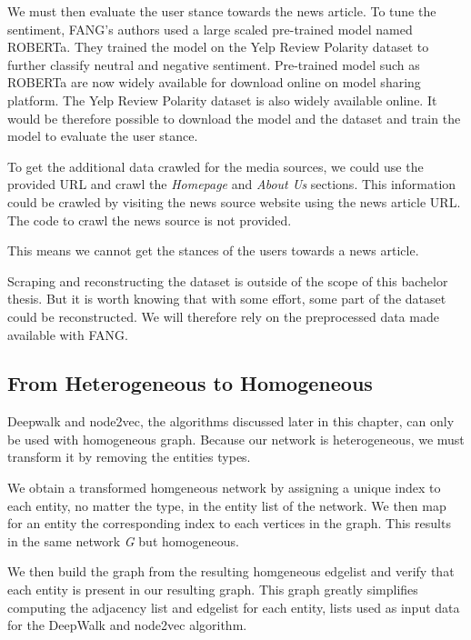 We must then evaluate the user stance towards the news article.
To tune the sentiment, FANG's authors used a large scaled pre-trained model named ROBERTa. They trained the model on the Yelp Review Polarity dataset to further classify neutral and negative sentiment.
Pre-trained model such as ROBERTa are now widely available for download online on model sharing platform.
The Yelp Review Polarity dataset is also widely available online.
It would be therefore possible to download the model and the dataset and train the model to evaluate the user stance.

To get the additional data crawled for the media sources, we could use the provided URL and crawl the \textit{Homepage} and \textit{About Us} sections.
This information could be crawled by visiting the news source website using the news article URL.
The code to crawl the news source is not provided.

This means we cannot get the stances of the users towards a news article.

Scraping and reconstructing the dataset is outside of the scope of this bachelor thesis.
But it is worth knowing that with some effort, some part of the dataset could be reconstructed.
We will therefore rely on the preprocessed data made available with FANG.

\subsection{From Heterogeneous to Homogeneous}
\label{sub:h2h}

Deepwalk and node2vec, the algorithms discussed later in this chapter, can only be used with homogeneous graph.
Because our network is heterogeneous, we must transform it by removing the entities types.

We obtain a transformed homgeneous network by assigning a unique index to each entity, no matter the type, in the entity list of the network.
We then map for an entity the corresponding index to each vertices in the graph.
This results in the same network \textit{G} but homogeneous.

We then build the graph from the resulting homgeneous edgelist and verify that each entity is present in our resulting graph.
This graph greatly simplifies computing the adjacency list and edgelist for each entity, lists used as input data for the DeepWalk and node2vec algorithm.
